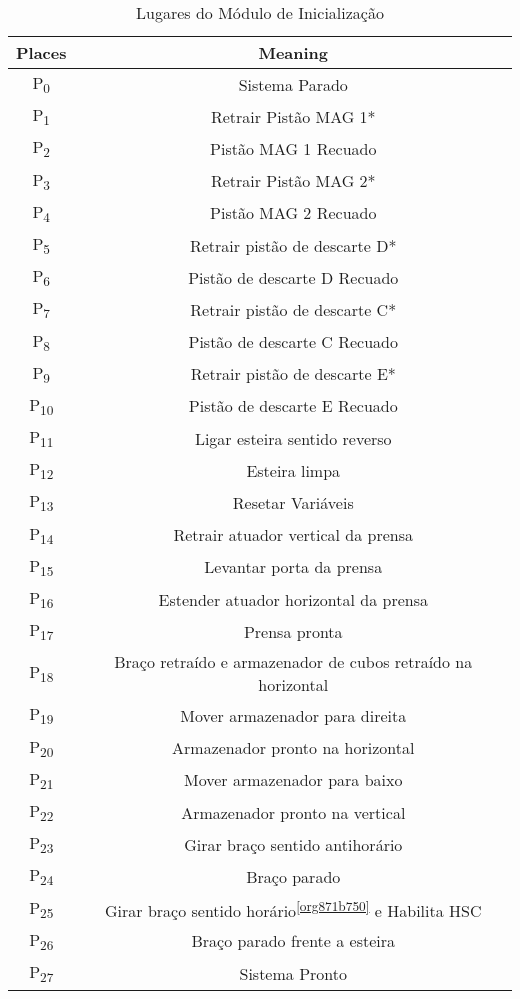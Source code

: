 \begin{table}[htbp]
\caption{Lugares do Módulo de Inicialização}
\centering
\begin{tabular}{c|c}
Places & Meaning\\
\hline
P\textsubscript{0} & Sistema Parado\\
P\textsubscript{1} & Retrair Pistão MAG 1*\\
P\textsubscript{2} & Pistão MAG 1 Recuado\\
P\textsubscript{3} & Retrair Pistão MAG 2*\\
P\textsubscript{4} & Pistão MAG 2 Recuado\\
P\textsubscript{5} & Retrair pistão de descarte D*\\
P\textsubscript{6} & Pistão de descarte D Recuado\\
P\textsubscript{7} & Retrair pistão de descarte C*\\
P\textsubscript{8} & Pistão de descarte C Recuado\\
P\textsubscript{9} & Retrair pistão de descarte E*\\
P\textsubscript{10} & Pistão de descarte E Recuado\\
P\textsubscript{11} & Ligar esteira sentido reverso\\
P\textsubscript{12} & Esteira limpa\\
P\textsubscript{13} & Resetar Variáveis\footnotemark\\
P\textsubscript{14} & Retrair atuador vertical da prensa\\
P\textsubscript{15} & Levantar porta da prensa\\
P\textsubscript{16} & Estender atuador horizontal da prensa\\
P\textsubscript{17} & Prensa pronta\\
P\textsubscript{18} & Braço retraído e armazenador de cubos retraído na horizontal\\
P\textsubscript{19} & Mover armazenador para direita\\
P\textsubscript{20} & Armazenador pronto na horizontal\\
P\textsubscript{21} & Mover armazenador para baixo\\
P\textsubscript{22} & Armazenador pronto na vertical\\
P\textsubscript{23} & Girar braço sentido antihorário\footnotemark\\
P\textsubscript{24} & Braço parado\\
P\textsubscript{25} & Girar braço sentido horário\textsuperscript{\ref{org871b750}} e Habilita HSC\\
P\textsubscript{26} & Braço parado frente a esteira\\
P\textsubscript{27} & Sistema Pronto\\
\end{tabular}
\end{table}

